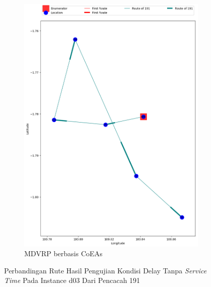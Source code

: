 \begin{figure}[H]
	\centering
	\begin{subfigure}[t]{\textwidth}
		\centering
		\includegraphics[width=\textwidth]{Resources/Images/delayed_3/real_m15_n100_delayed_3_191_coes}
		\caption{MDVRP berbasis CoEAs}
		\label{fig:real_m15_n100_delayed_3_191_coes}
	\end{subfigure}
	\caption{Perbandingan Rute Hasil Pengujian Kondisi Delay Tanpa \textit{Service Time} Pada Instance d03 Dari Pencacah 191}
	\label{fig:real_m15_n100_delayed_3_191}
\end{figure}



